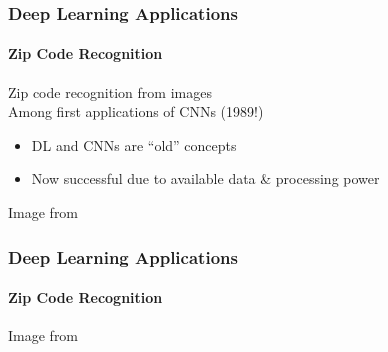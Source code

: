 \documentclass[xetex,professionalfont]{beamer}
\begin{document}
\begin{frame}
\frametitle{Deep Learning Applications}
\framesubtitle{Zip Code Recognition}

Zip code recognition from images\\\medskip
Among first applications of CNNs (1989!)
\begin{itemize}
    \item DL and CNNs are \enquote{old} concepts
    \item Now successful due to available data \& processing power %
\end{itemize}

\bigskip
\begin{center}
    {\centering Image from \cite{lecun1989}}
\end{center}

\end{frame}


\begin{frame}
\frametitle{Deep Learning Applications}
\framesubtitle{Zip Code Recognition}


\begin{center}
    {\centering Image from \cite{lecun1989}}
\end{center}

\end{frame}
\end{document}
